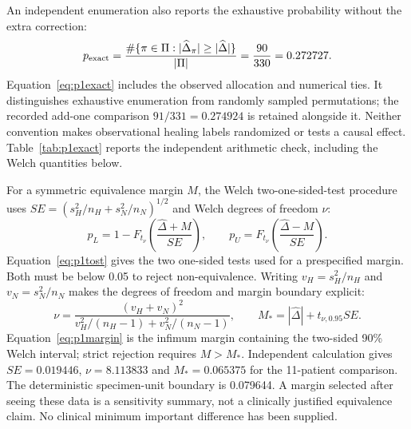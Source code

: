 \documentclass[10pt,a4paper]{article}
\begin{document}
An independent enumeration also reports the exhaustive probability without the extra correction:
\begin{equation}
p_{\rm exact}=\frac{\#\{\pi\in\Pi:|\widehat\Delta_\pi|\geq|\widehat\Delta|\}}{|\Pi|}=\frac{90}{330}=0.272727.\label{eq:p1exact}
\end{equation}
Equation~\eqref{eq:p1exact} includes the observed allocation and numerical ties. It distinguishes exhaustive enumeration from randomly sampled permutations; the recorded add-one comparison $91/331=0.274924$ is retained alongside it. Neither convention makes observational healing labels randomized or tests a causal effect. Table~\ref{tab:p1exact} reports the independent arithmetic check, including the Welch quantities below.

For a symmetric equivalence margin $M$, the Welch two-one-sided-test procedure uses $SE=(s_H^2/n_H+s_N^2/n_N)^{1/2}$ and Welch degrees of freedom $\nu$:
\begin{equation}
p_L=1-F_{t_\nu}\!\left(\frac{\widehat\Delta+M}{SE}\right),\qquad
p_U=F_{t_\nu}\!\left(\frac{\widehat\Delta-M}{SE}\right).\label{eq:p1tost}
\end{equation}
Equation~\eqref{eq:p1tost} gives the two one-sided tests used for a prespecified margin. Both must be below 0.05 to reject non-equivalence. Writing $v_H=s_H^2/n_H$ and $v_N=s_N^2/n_N$ makes the degrees of freedom and margin boundary explicit:
\begin{equation}
\nu=\frac{(v_H+v_N)^2}{v_H^2/(n_H-1)+v_N^2/(n_N-1)},\qquad
M_*=|\widehat\Delta|+t_{\nu,0.95}SE.\label{eq:p1margin}
\end{equation}
Equation~\eqref{eq:p1margin} is the infimum margin containing the two-sided 90\% Welch interval; strict rejection requires $M>M_*$. Independent calculation gives $SE=0.019446$, $\nu=8.113833$ and $M_*=0.065375$ for the 11-patient comparison. The deterministic specimen-unit boundary is 0.079644. A margin selected after seeing these data is a sensitivity summary, not a clinically justified equivalence claim. No clinical minimum important difference has been supplied.
\end{document}
